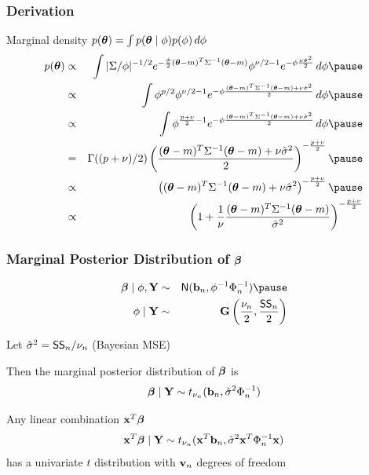 \documentclass[handout]{beamer}
\begin{document}
\begin{frame}
  \frametitle{Derivation}
Marginal density  $p(\boldsymbol{\theta}) = \int p(\boldsymbol{\theta} \mid \phi) p(\phi) \, d\phi$
\pause
\begin{eqnarray*}
  p(\tb) & \propto & \int |\Sigma/\phi|^{-1/2}
e^{- \frac{\phi}{2} (\tb - m)^T
    \Sigma^{-1} (\tb - m)}  \phi^{\nu/2 - 1} e^{- \phi \frac{\nu
      \shat}{2}}\, d \phi \pause \\
  & \propto & \int \phi^{p/2} \phi^{\nu/2 - 1}
e^{- \phi \frac{(\tb - m)^T
    \Sigma^{-1} (\tb - m)+  \nu
      \shat}{2}}\, d \phi \pause \\
 & \propto & \int \phi^{\frac{p +\nu}{2} - 1}
e^{- \phi \frac{(\tb - m)^T
    \Sigma^{-1} (\tb - m)+  \nu
      \shat}{2}} \, d \phi \pause \\
& = & \Gamma((p + \nu)/2 ) \left( \frac{(\tb - m)^T
    \Sigma^{-1} (\tb - m)+  \nu
      \shat}{2} \right)^{- \frac{p + \nu}{2}} \pause \\
& \propto &  \left( (\tb - m)^T
    \Sigma^{-1} (\tb - m)+  \nu
      \shat \right)^{- \frac{p + \nu}{2}} \pause \\
& \propto &  \left( 1 + \frac{1}{\nu}  \frac{(\tb - m)^T
    \Sigma^{-1} (\tb - m)}{\shat}
       \right)^{- \frac{p + \nu}{2}}
\end{eqnarray*}
\end{frame}

\begin{frame}
  \frametitle{Marginal Posterior Distribution of $\boldsymbol{\beta}$}
  \begin{eqnarray*}
\b \mid \phi, \Y  & \sim & \N( \bv_n, \phi^{-1} \Phi_n^{-1}) \pause \\
 \phi \mid \Y & \sim & \G\left(\frac{\nu_n}{2},  \frac{\SS_n}{ 2} \right)
  \end{eqnarray*}
\pause

Let ${\hat{\sigma}}^2 = \textsf{SS}_n/\nu_n$  (Bayesian MSE) \pause

Then the marginal posterior distribution of $\boldsymbol{\beta}$ is
$$
\boldsymbol{\beta}  \mid \mathbf{Y} \sim t_{\nu_n} (\mathbf{b}_n, {\hat{\sigma}}^2 \Phi_n^{-1})
$$ \pause


Any linear combination $\mathbf{x}^T\boldsymbol{\beta}$
$$\mathbf{x}^T\boldsymbol{\beta}  \mid \mathbf{Y} \sim t_{\nu_n}
(\mathbf{x}^T\mathbf{b}_n, {\hat{\sigma}}^2 \mathbf{x}^T\Phi_n^{-1}\mathbf{x})$$ has a univariate
$t$ distribution with $\mathbf{v}_n$ degrees of freedom

\end{frame}
\end{document}
